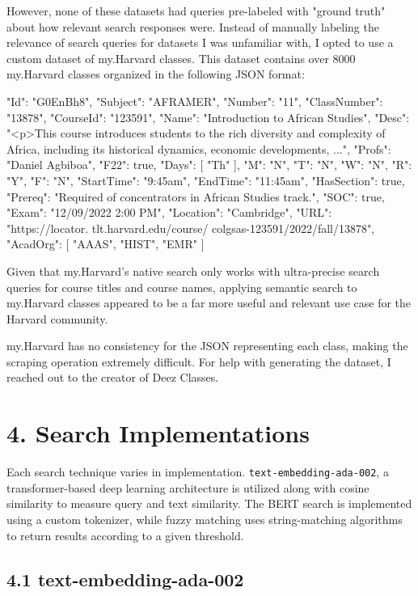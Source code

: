 \documentclass[
	a4paper, %
	10pt, %
	unnumberedsections, %
	twoside, %
]{LTJournalArticle}
\begin{document}
However, none of these datasets had queries pre-labeled with "ground truth" about how relevant search responses were. Instead of manually labeling the relevance of search queries for datasets I was unfamiliar with, I opted to use a custom dataset of my.Harvard classes. This dataset contains over $8000$ my.Harvard classes organized in the following JSON format: 

\begin{python}
	{
		"Id": "G0EnBh8",
		"Subject": "AFRAMER",
		"Number": "11",
		"ClassNumber": "13878",
		"CourseId": "123591",
		"Name": "Introduction to African 
		Studies",
		"Desc": "<p>This course introduces 
		students to the rich diversity and 
		complexity of Africa, including 
		its historical dynamics, 
		economic developments, ...",
		"Profs": "Daniel Agbiboa",
		"F22": true,
		"Days": [
		"Th"
		],
		"M": "N",
		"T": "N",
		"W": "N",
		"R": "Y",
		"F": "N",
		"StartTime": "9:45am",
		"EndTime": "11:45am",
		"HasSection": true,
		"Prereq": "Required of 
		concentrators in African 
		Studies track.",
		"SOC": true,
		"Exam": "12/09/2022 2:00 PM",
		"Location": "Cambridge",
		"URL": "https://locator.
		tlt.harvard.edu/course/
		colgsas-123591/2022/fall/13878",
		"AcadOrg": [
		"AAAS",
		"HIST",
		"EMR"
		]
	}
\end{python}

Given that my.Harvard's native search only works with ultra-precise search queries for course titles and course names, applying semantic search to my.Harvard classes appeared to be a far more useful and relevant use case for the Harvard community.

my.Harvard has no consistency for the JSON representing each class, making the scraping operation extremely difficult. For help with generating the dataset, I reached out to the creator of Deez Classes. 

\section{4. Search Implementations}

Each search technique varies in implementation. \texttt{text-embedding-ada-002}, a transformer-based deep learning architecture is utilized along with cosine similarity to measure query and text similarity. The BERT search is implemented using a custom tokenizer, while fuzzy matching uses string-matching algorithms to return results according to a given threshold.

\subsection{4.1 text-embedding-ada-002}
\end{document}

